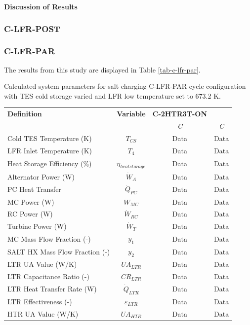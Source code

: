 \begin{paracol}{2}
\textbf{Discussion of Results}

\subsubsection{C-LFR-POST}


\subsubsection{C-LFR-PAR}

The results from this study are displayed in Table \ref{tab-c-lfr-par}.

\begin{specialtable}[H]
    \caption{Calculated system parameters for salt charging C-LFR-PAR cycle configuration with TES cold storage varied and LFR low temperature set to 673.2 K.\label{tab-c-lfr-par}}
    \begin{tabular}{lccc}
    \toprule
    \textbf{Definition} & \textbf{Variable} & \textbf{C-2HTR3T-ON} & \\
    & & \textit{C} & \textit{C}\\
    \midrule	
    Cold TES Temperature (K)	&	$T_{CS}$	&	Data	&	Data	\\
    LFR Inlet Temperature (K)	&	$T_{4}$	&	Data	&	Data	\\
    Heat Storage Efficiency (\%)	&	$\eta_{heatstorage}$	&	Data	&	Data	\\
    Alternator Power (W)	&	$\dot{W}_{A}$	&	Data	&	Data	\\
    PC Heat Transfer	&	$\dot{Q}_{PC}$	&	Data	&	Data	\\
    MC Power (W)	&	$\dot{W}_{MC}$	&	Data	&	Data	\\
    RC Power (W)	&	$\dot{W}_{RC}$	&	Data	&	Data	\\
    Turbine Power (W)	&	$\dot{W}_{T}$	&	Data	&	Data	\\
    MC Mass Flow Fraction (-)	&	$y_{1}$	&	Data	&	Data	\\
    SALT HX Mass Flow Fraction (-)	&	$y_{2}$	&	Data	&	Data	\\
    LTR UA Value (W/K)	&	$UA_{LTR}$	&	Data	&	Data	\\
    LTR Capacitance Ratio (-)	&	$CR_{LTR}$	&	Data	&	Data	\\
    LTR Heat Transfer Rate (W)	&	$\dot{Q}_{LTR}$	&	Data	&	Data	\\
    LTR Effectiveness (-)	&	$\varepsilon_{LTR}$	&	Data	&	Data	\\
    HTR UA Value (W/K)	&	$UA_{HTR}$	&	Data	&	Data	\\

\end{tabular}
\end{specialtable}
\end{paracol}
